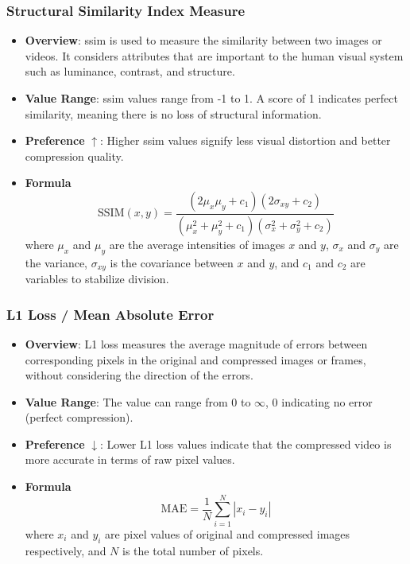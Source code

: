 \documentclass{ioereport}
\begin{document}
        \subsubsection{Structural Similarity Index Measure}
            \begin{itemize}
                \item \textbf{Overview}: \gls{ssim} is used to measure the similarity between two images or videos. It considers attributes that are important to the human visual system such as luminance, contrast, and structure.
                \item \textbf{Value Range}: \gls{ssim} values range from -1 to 1. A score of 1 indicates perfect similarity, meaning there is no loss of structural information.
                \item \textbf{Preference} $\uparrow$: Higher \gls{ssim} values signify less visual distortion and better compression quality.
                \item \textbf{Formula}
                \begin{equation}\label{eqn:SSIM}
                    \text{SSIM}(x, y) = \frac{(2 \mu_x \mu_y + c_1)(2 \sigma_{xy} + c_2)}{(\mu_x^2 + \mu_y^2 + c_1)(\sigma_x^2 + \sigma_y^2 + c_2)}
                \end{equation}
                where $\mu_x$ and $\mu_y$ are the average intensities of images $x$ and $y$, $\sigma_{x}$ and $\sigma_y$ are the variance, $\sigma_{xy}$ is the covariance between $x$ and $y$, and $c_1$ and $c_2$ are variables to stabilize division.
            \end{itemize}

        
        \subsubsection{L1 Loss / Mean Absolute Error}
            \begin{itemize}
                \item \textbf{Overview}: L1 loss measures the average magnitude of errors between corresponding pixels in the original and compressed images or frames, without considering the direction of the errors.
                \item \textbf{Value Range}: The value can range from 0 to $\infty$,  0 indicating no error (perfect compression).
                \item \textbf{Preference} $\downarrow$: Lower L1 loss values indicate that the compressed video is more accurate in terms of raw pixel values.
                \item \textbf{Formula}
                \begin{equation}
                    \text{MAE} = \frac{1}{N} \sum_{i=1}^{N} |x_i - y_i|
                \end{equation}
                where $x_i$ and $y_i$ are pixel values of original and compressed images respectively, and $N$ is the total number of pixels.
            \end{itemize}
\end{document}
